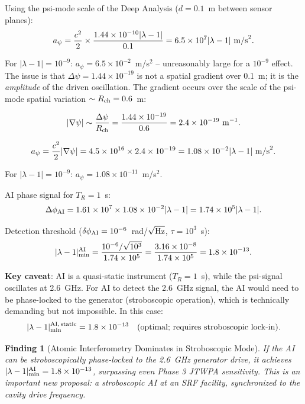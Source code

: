 \documentclass[11pt]{article}
\newtheorem{finding}{Finding}
\newcommand{\ee}[1]{\times 10^{#1}}
\begin{document}
Using the psi-mode scale of the Deep Analysis ($d = 0.1$~m between sensor planes):
\begin{equation}
a_\psi = \frac{c^2}{2} \times \frac{1.44\ee{-10}|\lambda-1|}{0.1}
= 6.5\ee{7}|\lambda-1|~{\rm m/s}^2.
\end{equation}

For $|\lambda-1| = 10^{-9}$: $a_\psi = 6.5\ee{-2}$~m/s$^2$ -- unreasonably large
for a $10^{-9}$ effect. The issue is that $\Delta\psi = 1.44\ee{-19}$ is not
a spatial gradient over 0.1~m; it is the \emph{amplitude} of the driven oscillation.
The gradient occurs over the scale of the psi-mode spatial variation
$\sim R_{\rm ch} = 0.6$~m:

\begin{equation}
|\nabla\psi| \sim \frac{\Delta\psi}{R_{\rm ch}} = \frac{1.44\ee{-19}}{0.6}
= 2.4\ee{-19}~{\rm m}^{-1}.
\end{equation}

\begin{equation}
a_\psi = \frac{c^2}{2}|\nabla\psi| = 4.5\ee{16} \times 2.4\ee{-19}
= 1.08\ee{-2}|\lambda-1|~{\rm m/s}^2.
\end{equation}

For $|\lambda-1| = 10^{-9}$: $a_\psi = 1.08\ee{-11}$~m/s$^2$.

AI phase signal for $T_R = 1$~s:
\begin{equation}
\Delta\phi_{\rm AI} = 1.61\ee{7} \times 1.08\ee{-2}|\lambda-1| = 1.74\ee{5}|\lambda-1|.
\end{equation}

Detection threshold ($\delta\phi_{\rm AI} = 10^{-6}$~rad/$\sqrt{\rm Hz}$,
$\tau = 10^3$~s):
\begin{equation}
|\lambda-1|_{\rm min}^{\rm AI} = \frac{10^{-6}/\sqrt{10^3}}{1.74\ee{5}}
= \frac{3.16\ee{-8}}{1.74\ee{5}} = 1.8\ee{-13}.
\end{equation}

\textbf{Key caveat}: AI is a quasi-static instrument ($T_R = 1$~s), while the psi-signal
oscillates at 2.6~GHz. For AI to detect the 2.6~GHz signal, the AI would need
to be phase-locked to the generator (stroboscopic operation), which is technically
demanding but not impossible. In this case:
\begin{equation}
|\lambda-1|_{\rm min}^{\rm AI,\,static} = 1.8\ee{-13}
\quad\text{(optimal; requires stroboscopic lock-in)}.
\end{equation}

\begin{finding}[Atomic Interferometry Dominates in Stroboscopic Mode]
If the AI can be stroboscopically phase-locked to the 2.6~GHz generator drive,
it achieves $|\lambda-1|_{\rm min}^{\rm AI} = 1.8\ee{-13}$, surpassing even
Phase 3 JTWPA sensitivity. This is an important new proposal: a stroboscopic AI
at an SRF facility, synchronized to the cavity drive frequency.
\end{finding}
\end{document}
